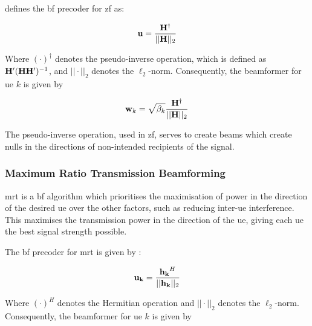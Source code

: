 \par
{} defines the \ac{bf} precoder for \ac{zf} as:

\begin{equation}
	\mathbf{u} = \frac{\mathbf{H}^{\dagger}}{\lvert\lvert \mathbf{H} \rvert\rvert_{2}}
	\label{eq:zf}
\end{equation}

\par
Where $(\cdot)^\dagger$ denotes the pseudo-inverse operation, which is defined as $\mathbf{H}'(\mathbf{H}\mathbf{H}')^{-1}$, and $||\cdot||_2$ denotes the $\ell_{2}$-norm.
Consequently, the beamformer for \ac{ue} $k$ is given by

\begin{equation}
	\mathbf{w}_k = \sqrt{\beta_k} \frac{\mathbf{H}^{\dagger}}{\lvert\lvert \mathbf{H} \rvert\rvert_{2}}
	\label{eq:bfzf}
\end{equation}

\par
The pseudo-inverse operation, used in \ac{zf}, serves to create beams which create nulls in the directions of non-intended recipients of the signal.

\iffalse
\begin{figure}
	\centering
	\texttt{[image: 2ueZF]}
	\caption{2-UE NOMA ZF BF}
	\label{fig:ZF}
\end{figure}
\fi

\subsubsection{Maximum Ratio Transmission Beamforming}
\ac{mrt} is a \ac{bf} algorithm which prioritises the maximisation of power in the direction of the desired \ac{ue} over the other factors, such as reducing inter-\ac{ue} interference.
This maximises the transmission power in the direction of the \ac{ue}, giving each \ac{ue} the best signal strength possible.

\par
The \ac{bf} precoder for \ac{mrt} is given by :

\begin{equation}
	\mathbf{u_k} = \frac{\mathbf{h_k}^H}{\lvert\lvert \mathbf{h_k} \rvert\rvert_2}
	\label{eq:mrt}
\end{equation}

\par
Where $(\cdot)^H$ denotes the Hermitian operation and $||\cdot||_2$ denotes the $\ell_{2}$-norm.
Consequently, the beamformer for \ac{ue} $k$ is given by

